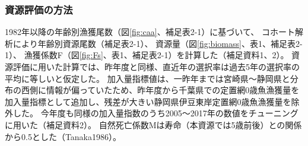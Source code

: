 \subsubsection{資源評価の方法}
1982年以降の年齢別漁獲尾数（図\ref{fig:caa}、補足表2-1）に基づいて、
コホート解析により年齢別資源尾数（補足表2-1）、
資源量（図\ref{fig:biomass}、表1、補足表2-1）、
漁獲係数F（図\ref{fig:Fs}、表1、補足表2-1）を計算した（補足資料1、2）。
資源評価に用いた計算では、昨年度と同様、直近年の選択率は過去5年の選択率の平均に等しいと仮定した。
加入量指標値は、一昨年までは宮崎県～静岡県と分布の西側に情報が偏っていたため、昨年度から千葉県での定置網0歳魚漁獲量を加入量指標として追加し、残差が大きい静岡県伊豆東岸定置網0歳魚漁獲量を除外した。
今年度も同様の加入量指数のうち2005～2017年の数値をチューニングに用いた（補足資料2）。
自然死亡係数Mは寿命（本資源では5歳前後）との関係から0.5とした（Tanaka1986）。
